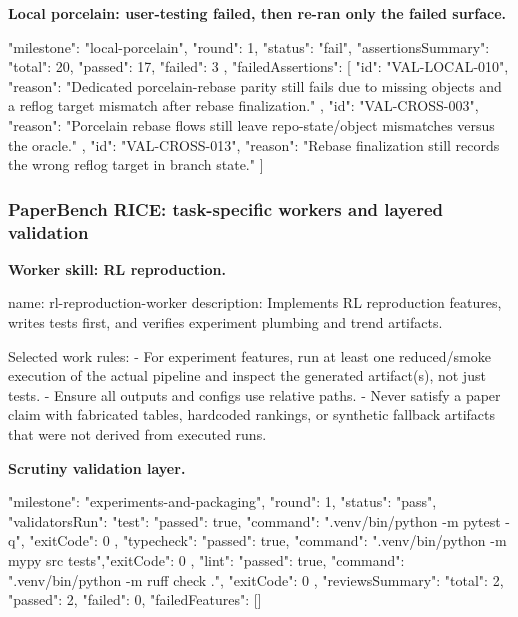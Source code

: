 \documentclass[11pt,a4paper]{article}
\begin{document}
\textbf{Local porcelain: user-testing failed, then re-ran only the failed surface.}

\begin{cbox}
{
  "milestone": "local-porcelain",
  "round": 1,
  "status": "fail",
  "assertionsSummary": { "total": 20, "passed": 17, "failed": 3 },
  "failedAssertions": [
    { "id": "VAL-LOCAL-010", "reason": "Dedicated porcelain-rebase parity still fails due to missing objects and a reflog target mismatch after rebase finalization." },
    { "id": "VAL-CROSS-003", "reason": "Porcelain rebase flows still leave repo-state/object mismatches versus the oracle." },
    { "id": "VAL-CROSS-013", "reason": "Rebase finalization still records the wrong reflog target in branch state." }
  ]
}
\end{cbox}

\subsubsection{PaperBench RICE: task-specific workers and layered validation}

\textbf{Worker skill: RL reproduction.}

\begin{cbox}
name: rl-reproduction-worker
description: Implements RL reproduction features, writes tests first, and verifies
  experiment plumbing and trend artifacts.

Selected work rules:
- For experiment features, run at least one reduced/smoke execution of the
  actual pipeline and inspect the generated artifact(s), not just tests.
- Ensure all outputs and configs use relative paths.
- Never satisfy a paper claim with fabricated tables, hardcoded rankings, or
  synthetic fallback artifacts that were not derived from executed runs.
\end{cbox}

\textbf{Scrutiny validation layer.}

\begin{cbox}
{
  "milestone": "experiments-and-packaging",
  "round": 1,
  "status": "pass",
  "validatorsRun": {
    "test":      { "passed": true, "command": ".venv/bin/python -m pytest -q",   "exitCode": 0 },
    "typecheck": { "passed": true, "command": ".venv/bin/python -m mypy src tests","exitCode": 0 },
    "lint":      { "passed": true, "command": ".venv/bin/python -m ruff check .", "exitCode": 0 }
  },
  "reviewsSummary": { "total": 2, "passed": 2, "failed": 0, "failedFeatures": [] }
}
\end{cbox}
\end{document}
